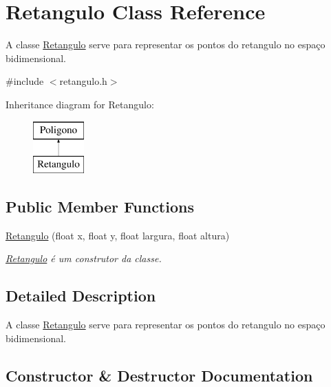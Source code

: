 \hypertarget{class_retangulo}{}\section{Retangulo Class Reference}
\label{class_retangulo}


A classe \mbox{\hyperlink{class_retangulo}{Retangulo}} serve para representar os pontos do retangulo no espaço bidimensional.  




{\ttfamily \#include $<$retangulo.\+h$>$}

Inheritance diagram for Retangulo\+:\begin{figure}[H]
\begin{center}
\leavevmode
\includegraphics[height=2.000000cm]{class_retangulo}
\end{center}
\end{figure}
\subsection*{Public Member Functions}
\begin{DoxyCompactItemize}
\item 
\mbox{\hyperlink{class_retangulo_acca1dd211eefc8dc04658c943c0d1122}{Retangulo}} (float x, float y, float largura, float altura)
\begin{DoxyCompactList}\small\item\em \mbox{\hyperlink{class_retangulo}{Retangulo}} é um construtor da classe. \end{DoxyCompactList}\end{DoxyCompactItemize}


\subsection{Detailed Description}
A classe \mbox{\hyperlink{class_retangulo}{Retangulo}} serve para representar os pontos do retangulo no espaço bidimensional. 

\subsection{Constructor \& Destructor Documentation}
\mbox{\label{class_retangulo_acca1dd211eefc8dc04658c943c0d1122}} 
